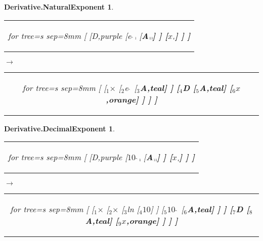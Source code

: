 \documentclass[UTF8,10pt]{ctexart}
\newcommand{\Bigskip}{\bigskip\medskip}
\newcommand{\subtreeA}{\bf A}
\newcommand{\I}{$_{\scriptscriptstyle 1}$}
\newcommand{\II}{$_{\scriptscriptstyle 2}$}
\newcommand{\III}{$_{\scriptscriptstyle 3}$}
\newcommand{\IV}{$_{\scriptscriptstyle 4}$}
\newcommand{\V}{$_{\scriptscriptstyle 5}$}
\newcommand{\VI}{$_{\scriptscriptstyle 6}$}
\newcommand{\VII}{$_{\scriptscriptstyle 7}$}
\newcommand{\VIII}{$_{\scriptscriptstyle 8}$}
\newcommand{\IX}{$_{\scriptscriptstyle 9}$}
\newcommand{\lc}{$_{\:\!\scriptscriptstyle\rm l\!}$}
\newcommand{\rc}{$_{\:\!\scriptscriptstyle\rm r\!}$}
\newcommand{\Derivative}{\rm D}
\newcommand{\x}{$x$}
\newcommand{\Ten}{$10$}
\newcommand{\Multiplication}{$\times$}
\newcommand{\NaturalExponent}{\rm e\,$\hat{\ }$}
\newcommand{\DecimalExponent}{\Ten\,$\hat{\ }$}
\newcommand{\NaturalLogarithm}{\rm ln}
\newtheorem*{Derivative.NaturalExponent}{\bf Derivative.NaturalExponent }
\newtheorem*{Derivative.DecimalExponent}{\bf Derivative.DecimalExponent }
\begin{document}
	\newpage

	\begin{center}\vspace*{\fill}
		\begin{Derivative.NaturalExponent}
			\qquad\par\Bigskip
			\begin{tabular}{c}
				\begin{forest}
					for tree={s sep=8mm}
					[
						[\Derivative,purple
							[\NaturalExponent\lc
								[\subtreeA\lc\lc]
							]
							[\x\rc]
						]
					]
				\end{forest}
			\end{tabular}
			\qquad
			$\longrightarrow$
			\qquad
			\begin{tabular}{c}
				\begin{forest}
					for tree={s sep=8mm}
					[
						[\I\Multiplication
							[\II\NaturalExponent
								[\III\subtreeA,teal]
							]
							[\IV\Derivative
								[\V\subtreeA,teal]
								[\VI\x,orange]
							]
						]
					]
				\end{forest}
			\end{tabular}
		\end{Derivative.NaturalExponent}
		\bigskip
		\begin{Derivative.DecimalExponent}
			\qquad\par\Bigskip
			\begin{tabular}{c}
				\begin{forest}
					for tree={s sep=8mm}
					[
						[\Derivative,purple
							[\DecimalExponent\lc
								[\subtreeA\lc\lc]
							]
							[\x\rc]
						]
					]
				\end{forest}
			\end{tabular}
			\qquad
			$\longrightarrow$
			\qquad
			\begin{tabular}{c}
				\begin{forest}
					for tree={s sep=8mm}
					[
						[\I\Multiplication
							[\II\Multiplication
								[\III\NaturalLogarithm
									[\IV\Ten]
								]
								[\V\DecimalExponent
									[\VI\subtreeA,teal]
								]
							]
							[\VII\Derivative
								[\VIII\subtreeA,teal]
								[\IX\x,orange]
							]
						]
					]
				\end{forest}
			\end{tabular}
		\end{Derivative.DecimalExponent}
	\vspace*{\fill}\end{center}
\end{document}
